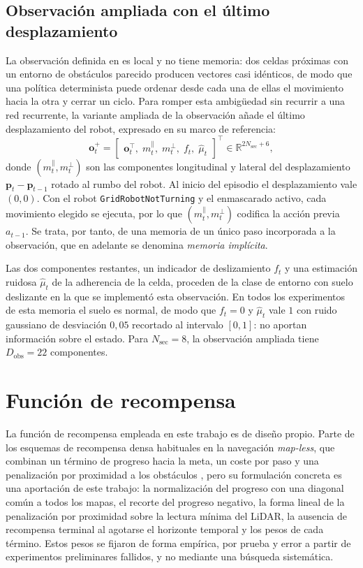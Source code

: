 \subsection{Observación ampliada con el último desplazamiento}\label{sec:obs_memoria}
La observación definida en  es local y no tiene memoria: dos
celdas próximas
con un entorno de obstáculos parecido producen vectores casi idénticos,
de modo que una política determinista puede ordenar desde cada una de
ellas el movimiento hacia la otra y cerrar un ciclo. Para romper esta
ambigüedad sin recurrir a una red recurrente, la variante ampliada de la
observación añade el último desplazamiento del robot, expresado en su
marco de referencia:
\begin{equation}\label{eq:obs_memoria}
    \mathbf{o}^{+}_t = \begin{bmatrix}
        \mathbf{o}_t^\top,\; m^{\parallel}_t,\; m^{\perp}_t,\; f_t,\; \hat{\mu}_t
    \end{bmatrix}^\top \in \mathbb{R}^{2 N_{\text{sec}} + 6},
\end{equation}
donde $(m^{\parallel}_t, m^{\perp}_t)$ son las componentes longitudinal y
lateral del desplazamiento $\mathbf{p}_t - \mathbf{p}_{t-1}$ rotado al
rumbo del robot. Al inicio del episodio el desplazamiento vale
$(0, 0)$. Con el robot \texttt{GridRobotNotTurning} y el enmascarado
activo, cada movimiento elegido se ejecuta, por lo que
$(m^{\parallel}_t, m^{\perp}_t)$ codifica la acción previa $a_{t-1}$.
Se trata, por tanto, de una memoria de un único paso incorporada a la
observación, que en adelante se denomina \textit{memoria implícita}.

Las dos componentes restantes, un indicador de deslizamiento $f_t$ y una
estimación ruidosa $\hat{\mu}_t$ de la adherencia de la celda, proceden
de la clase de entorno con suelo deslizante en la que se implementó esta
observación. En todos los experimentos de esta memoria el suelo es
normal, de modo que $f_t = 0$ y $\hat{\mu}_t$ vale $1$ con ruido gaussiano
de desviación $0{,}05$ recortado al intervalo $[0, 1]$: no aportan
información sobre el estado. Para $N_{\text{sec}} = 8$, la observación
ampliada tiene $D_{\text{obs}} = 22$ componentes.

\section{Función de recompensa}\label{sec:recompensa}
La función de recompensa empleada en este trabajo es de diseño propio.
Parte de los esquemas de recompensa densa habituales en la navegación
\textit{map-less}, que combinan un término de progreso hacia la meta, un
coste por paso y una penalización por proximidad a los obstáculos
\citep{gao2025hierarchical,xue2022using}, pero su formulación concreta es
una aportación de este trabajo: la normalización del progreso con una
diagonal común a todos los mapas, el recorte del progreso negativo, la
forma lineal de la penalización por proximidad sobre la lectura mínima
del LiDAR, la ausencia de recompensa terminal al agotarse el horizonte
temporal y los pesos de cada término. Estos pesos se fijaron de forma
empírica, por prueba y error a partir de experimentos preliminares
fallidos, y no mediante una búsqueda sistemática.

